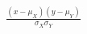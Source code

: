 \documentclass[preview]{standalone}
\begin{document}
\begin{align*}
\frac{(x - \mu_X)(y - \mu_Y)}{\sigma_X \sigma_Y}
\end{align*}
\end{document}
